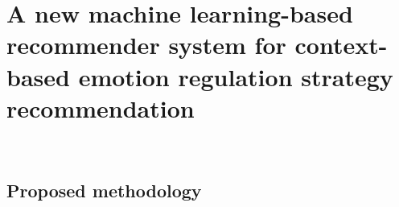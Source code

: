 \section{A new machine learning-based recommender system for context-based emotion regulation strategy recommendation}~\label{sec:evaluation}

\subsection{Proposed methodology}~\label{subsec:RQs}